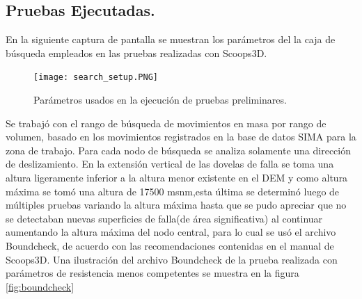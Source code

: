 \subsection{Pruebas Ejecutadas.}
En la siguiente captura de pantalla se muestran los par\'{a}metros del la caja de b\'{u}squeda
empleados en las pruebas realizadas con Scoops3D.\\

\begin{figure}[H]
\centering
	\texttt{[image: search\_setup.PNG]} 
	\caption{Par\'ametros usados en la ejecuci\'on de pruebas preliminares.}

\end{figure}


Se trabaj\'{o} con el rango de b\'{u}squeda de movimientos en masa por rango de volumen,
basado en los movimientos registrados en la base de datos SIMA para la zona de trabajo.
Para cada nodo de b\'{u}squeda se analiza solamente una direcci\'{o}n de deslizamiento.
En la extensi\'{o}n vertical de las dovelas de falla se toma una altura ligeramente inferior a la
altura menor existente en el DEM y como altura m\'{a}xima se tom\'{o} una altura de 17500
msnm,esta \'{u}ltima se determin\'{o} luego de m\'{u}ltiples pruebas variando la altura m\'{a}xima hasta
que se pudo apreciar que no se detectaban nuevas superficies de falla(de \'area significativa) al continuar
aumentando la altura m\'{a}xima del nodo central, para lo cual se us\'{o} el archivo Boundcheck, de acuerdo con las recomendaciones contenidas en el manual de Scoops3D. Una ilustraci\'on del archivo Boundcheck de la prueba realizada con par\'ametros de resistencia menos competentes se muestra en la figura \ref{fig:boundcheck} 

